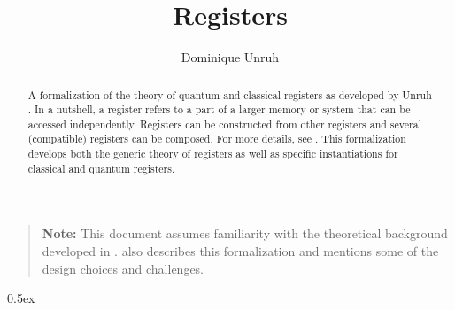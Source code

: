 \documentclass{article}
\begin{document}
\title{Registers}
\author{Dominique Unruh}
\maketitle

\begin{abstract}
  A formalization of the theory of quantum and classical registers as
  developed by Unruh \cite{unruh21registers}. In a nutshell, a
  register refers to a part of a larger memory or system that can be
  accessed independently.  Registers can be constructed from other
  registers and several (compatible) registers can be composed. For
  more details, see \cite{unruh21registers}. This formalization
  develops both the generic theory of registers as well as specific
  instantiations for classical and quantum registers.
\end{abstract}

\begin{quote}
  \textbf{Note:} This document assumes familiarity with the theoretical background developed in \cite{unruh21registers}.
  \cite{unruh21registers} also describes this formalization and mentions some of the design choices and challenges.
\end{quote}

\tableofcontents

\parindent 0pt\parskip 0.5ex





\end{document}
